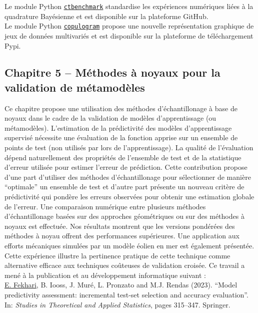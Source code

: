 \noindent
{} Le module Python \href{https://github.com/efekhari27/ctbenchmark}{\texttt{ctbenchmark}} standardise les expériences numériques liées à la quadrature Bayésienne et est disponible sur la plateforme GitHub.\\

\noindent
{} Le module Python \href{https://github.com/efekhari27/copulogr    m}{\texttt{copulogram}} propose une nouvelle représentation graphique de jeux de données multivariés et est disponible sur la plateforme de téléchargement Pypi.



\subsection*{Chapitre 5 -- Méthodes à noyaux pour la validation de métamodèles}

Ce chapitre propose une utilisation des méthodes d'échantillonage à base de noyaux dans le cadre de la validation de modèles d'apprentissage (ou métamodèles). 
L'estimation de la prédictivité des modèles d'apprentissage supervisé nécessite une évaluation de la fonction apprise sur un ensemble de points de test (non utilisés par lors de l'apprentissage). 
La qualité de l'évaluation dépend naturellement des propriétés de l'ensemble de test et de la statistique d'erreur utilisée pour estimer l'erreur de prédiction. 
Cette contribution propose d'une part d'utiliser des méthodes d'échantillonage pour sélectionner de manière ``optimale'' un ensemble de test et d'autre part présente un nouveau critère de prédictivité qui pondère les erreurs observées pour obtenir une estimation globale de l'erreur. 
Une comparaison numérique entre plusieurs méthodes d'échantillonage basées sur des approches géométriques \cite{shang_apley_2020} ou sur des méthodes à noyaux \cite{chen_welling_2010,mak_joseph_2018} est effectuée. 
Nos résultats montrent que les versions pondérées des méthodes à noyau offrent des performances supérieures. 
Une application aux efforts mécaniques simulées par un modèle éolien en mer est également présentée. 
Cette expérience illustre la pertinence pratique de cette technique comme alternative efficace aux techniques coûteuses de validation croisée. 
Ce travail a mené à la publication et au développement informatique suivant : \\

\noindent
{} \underline{E. Fekhari}, B. Iooss, J. Muré, L. Pronzato and M.J. Rendas (2023). ``Model predictivity assessment: incremental test-set selection and accuracy evaluation''. In: \textit{Studies in Theoretical and Applied Statistics}, pages 315--347. Springer.\\

